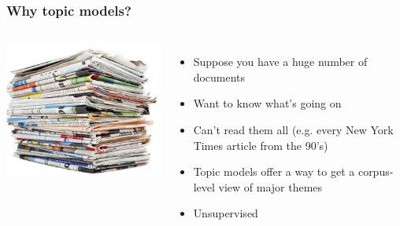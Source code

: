 

\providecommand{\graphscale}{0.6}


\newcommand{\dirfunc}[3]{ \frac{ \prod_{#1}^{#2} \g{ #3 } } { \g{ \sum_{#1}^{#2} #3 }}}
\newcommand{\dirnum}[4]{ \frac{\g{ #3 }}{#4} \prod_{#1}^{#2} }
\newcommand{\dirden}[3]{ \g{ \sum_{#1}^{#2} #3 } }


\begin{frame}

	\frametitle{Why topic models?}

	\begin{columns}


	\includegraphics[width=1\linewidth]{topic_models/newspapers}


	\begin{itemize}
		\item Suppose you have a huge number of documents
		\item Want to know what's going on
		\item Can't read them all (e.g. every New York Times article from the 90's)
		\item Topic models offer a way to get a corpus-level view of major themes
		\pause
		\item Unsupervised
	\end{itemize}


	\end{columns}

\end{frame}

